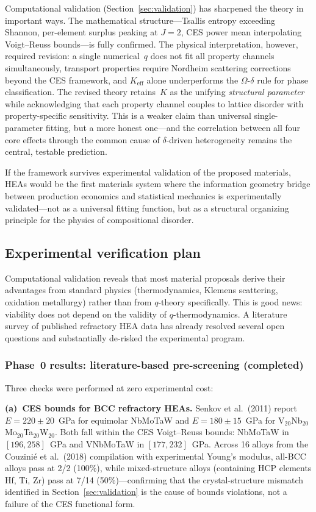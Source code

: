 \documentclass[12pt,letterpaper]{article}
\theoremstyle{definition}
\begin{document}
Computational validation (Section~\ref{sec:validation}) has sharpened the theory in important ways.  The mathematical structure---Tsallis entropy exceeding Shannon, per-element surplus peaking at $J = 2$, CES power mean interpolating Voigt--Reuss bounds---is fully confirmed.  The physical interpretation, however, required revision: a single numerical~$q$ does not fit all property channels simultaneously, transport properties require Nordheim scattering corrections beyond the CES framework, and $K_{\mathrm{eff}}$ alone underperforms the $\Omega$-$\delta$ rule for phase classification.  The revised theory retains~$K$ as the unifying \emph{structural parameter} while acknowledging that each property channel couples to lattice disorder with property-specific sensitivity.  This is a weaker claim than universal single-parameter fitting, but a more honest one---and the correlation between all four core effects through the common cause of $\delta$-driven heterogeneity remains the central, testable prediction.

If the framework survives experimental validation of the proposed materials, HEAs would be the first materials system where the information geometry bridge between production economics and statistical mechanics is experimentally validated---not as a universal fitting function, but as a structural organizing principle for the physics of compositional disorder.


\subsection{Experimental verification plan}

Computational validation reveals that most material proposals derive their advantages from standard physics (thermodynamics, Klemens scattering, oxidation metallurgy) rather than from $q$-theory specifically.  This is good news: viability does not depend on the validity of $q$-thermodynamics.  A literature survey of published refractory HEA data has already resolved several open questions and substantially de-risked the experimental program.

\subsubsection{Phase~0 results: literature-based pre-screening (completed)}

Three checks were performed at zero experimental cost:

\textbf{(a)~CES bounds for BCC refractory HEAs.}  Senkov et al.\ (2011) report $E = 220 \pm 20$~GPa for equimolar NbMoTaW and $E = 180 \pm 15$~GPa for V$_{20}$Nb$_{20}$Mo$_{20}$Ta$_{20}$W$_{20}$.  Both fall within the CES Voigt--Reuss bounds: NbMoTaW in $[196, 258]$~GPa and VNbMoTaW in $[177, 232]$~GPa.  Across 16 alloys from the Couzini\'e et al.\ (2018) compilation with experimental Young's modulus, all-BCC alloys pass at 2/2 (100\%), while mixed-structure alloys (containing HCP elements Hf, Ti, Zr) pass at 7/14 (50\%)---confirming that the crystal-structure mismatch identified in Section~\ref{sec:validation} is the cause of bounds violations, not a failure of the CES functional form.
\end{document}

